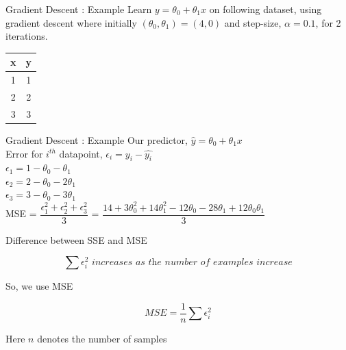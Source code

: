 \documentclass{beamer}
\begin{document}
	\begin{frame}{Gradient Descent : Example}
Learn $y = \theta_0 + \theta_1 x$ on following dataset, using gradient descent where initially $(\theta_0, \theta_1) = (4,0)$ and step-size, $\alpha  = 0.1$, for 2 iterations. 
\begin{table}[]
	\centering
	\label{tab:my-table}
	\begin{tabular}{|c|c|}
		\hline
		\textbf{x} & \textbf{y} \\ \hline
		1 & 1 \\ \hline
		2 & 2 \\ \hline
		3 & 3 \\ \hline
	\end{tabular}
\end{table}
\end{frame}



\begin{frame}{Gradient Descent : Example}
Our predictor, $\hat{y} = \theta_0 + \theta_1x$\\
\vspace{1cm}
Error for $i^{th}$ datapoint, $\epsilon_i = y_i - \hat{y_i}$\\
$\epsilon_1 = 1 - \theta_0 - \theta_1$ \\
$\epsilon_2 = 2 - \theta_0 - 2\theta_1$ \\
$\epsilon_3 = 3 - \theta_0 - 3\theta_1$ \\

\vspace{1cm}
MSE = $\dfrac{\epsilon_1^2 + \epsilon_2^2 + \epsilon_3^2}{3}$ = $\dfrac{14 + 3\theta_0^2 + 14\theta_1^2 -12\theta_0 - 28\theta_1 + 12\theta_0\theta_1}{3}$\\
\end{frame}

	\begin{frame}{Difference between SSE and MSE}



\begin{equation*}
\sum \epsilon_{i}^{2} \textit{ increases as the number of examples increase}
\end{equation*}

So, we use MSE

\begin{equation*}
\textit{MSE} = \frac{1}{n} \sum \epsilon_{i}^{2}
\end{equation*}

Here $n$ denotes the number of samples



\end{frame}
\end{document}
